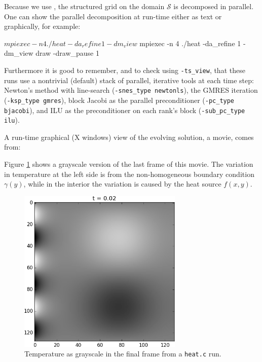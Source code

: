 Because we use \pDMDA, the structured grid on the domain $\mathcal{S}$ is decomposed in parallel.  One can show the parallel decomposition at run-time either as text or graphically, for example:
\begin{cline}
$ mpiexec -n 4 ./heat -da_refine 1 -dm_view
$ mpiexec -n 4 ./heat -da_refine 1 -dm_view draw -draw_pause 1
\end{cline}
Furthermore it is good to remember, and to check using \texttt{-ts\_view}, that these runs use a nontrivial (default) stack of parallel, iterative tools at each time step: Newton's method with line-search (\texttt{-snes\_type newtonls}), the GMRES iteration (\texttt{-ksp\_type gmres}), block Jacobi as the parallel preconditioner (\texttt{-pc\_type bjacobi}), and ILU as the preconditioner on each rank's block (\texttt{-sub\_pc\_type ilu}).

A run-time graphical (X windows) view of the evolving solution, a movie, comes from:
Figure \ref{fig:ts:heatfinaltime} shows a grayscale version of the last frame of this movie.  The variation in temperature at the left side is from the non-homogeneous boundary condition $\gamma(y)$, while in the interior the variation is caused by the heat source $f(x,y)$.
  
\begin{figure}
\includegraphics[width=0.7\textwidth]{figs/heatfinaltime}
\caption{Temperature as grayscale in the final frame from a \texttt{heat.c} run.}
\label{fig:ts:heatfinaltime}
\end{figure}

